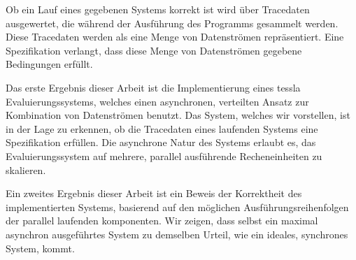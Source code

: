 Ob ein Lauf eines gegebenen Systems korrekt ist wird über Tracedaten ausgewertet, die während der Ausführung des Programms gesammelt werden.
Diese Tracedaten werden als eine Menge von Datenströmen repräsentiert.
Eine Spezifikation verlangt, dass diese Menge von Datenströmen gegebene Bedingungen erfüllt.

Das erste Ergebnis dieser Arbeit ist die Implementierung eines \gls{tessla} Evaluierungs\-systems, welches einen asynchronen, verteilten Ansatz zur Kombination von Datenströmen benutzt.
Das System, welches wir vorstellen, ist in der Lage zu erkennen, ob die Tracedaten eines laufenden Systems eine Spezifikation erfüllen.
Die asynchrone Natur des Systems erlaubt es, das Evaluierungssystem auf mehrere, parallel ausführende Recheneinheiten zu skalieren.

Ein zweites Ergebnis dieser Arbeit ist ein Beweis der Korrektheit des implementierten Systems, basierend auf den möglichen Ausführungsreihenfolgen der parallel laufenden komponenten.
Wir zeigen, dass selbst ein maximal asynchron ausgeführtes System zu demselben Urteil, wie ein ideales, synchrones System, kommt.
